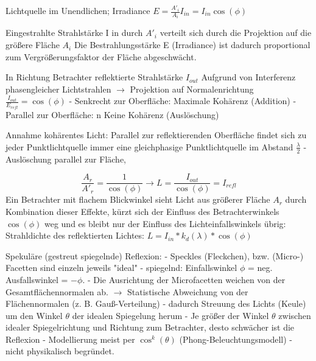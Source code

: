 \documentclass[10pt,landscape]{article}
\begin{document}
\begin{multicols}{3}
  Lichtquelle im Unendlichen; Irradiance $E=\frac{A'_i}{A_i}I_{in}=I_{in}\cos(\phi)$
  
  Eingestrahlte Strahlstärke I in durch $A'_i$ verteilt sich durch die Projektion auf die größere Fläche $A_i$ Die Bestrahlungsstärke E (Irradiance) ist dadurch proportional zum Vergrößerungsfaktor der Fläche abgeschwächt.
  
  In Richtung Betrachter reflektierte Strahlstärke $I_{out}$ Aufgrund von Interferenz phasengleicher Lichtstrahlen $\rightarrow$ Projektion auf Normalenrichtung $\frac{I_{out}}{E_{refl}}=\cos(\phi)$
  - Senkrecht zur Oberfläche: Maximale Kohärenz (Addition)
  - Parallel zur Oberfläche: n Keine Kohärenz (Auslöschung)
  
  
  Annahme kohärentes Licht: Parallel zur reflektierenden Oberfläche findet sich zu jeder Punktlichtquelle immer eine gleichphasige Punktlichtquelle im Abstand $\frac{\lambda}{2}$
  - Auslöschung parallel zur Fläche,
  
  
  $$\frac{A_r}{A'_r}=\frac{1}{\cos(\phi)} \rightarrow L=\frac{I_{out}}{\cos(\phi)}=I_{refl}$$
  Ein Betrachter mit flachem Blickwinkel sieht Licht aus größerer Fläche $A_r$ durch Kombination dieser Effekte, kürzt sich der Einfluss des Betrachterwinkels $\cos(\phi)$ weg und es bleibt nur der Einfluss des Lichteinfallswinkels übrig: Strahldichte des reflektierten Lichtes: $L=I_{in}*k_d(\lambda)*\cos(\phi)$
  
  Spekuläre (gestreut spiegelnde) Reflexion:
  - Speckles (Fleckchen), bzw. (Micro-) Facetten sind einzeln jeweils "ideal"
  - spiegelnd: Einfallswinkel $\phi$ = neg. Ausfallswinkel = $-\phi$.
  - Die Ausrichtung der Microfacetten weichen von der Gesamtflächennormalen ab. $\rightarrow$ Statistische Abweichung von der Flächennormalen (z. B. Gauß-Verteilung)
  - dadurch Streuung des Lichts (Keule) um den Winkel $\theta$ der idealen Spiegelung herum
  - Je größer der Winkel $\theta$ zwischen idealer Spiegelrichtung und Richtung zum Betrachter, desto schwächer ist die Reflexion
  - Modellierung meist per $\cos^k(\theta)$ (Phong-Beleuchtungsmodell) - nicht physikalisch begründet.
  

\end{multicols}
\end{document}
